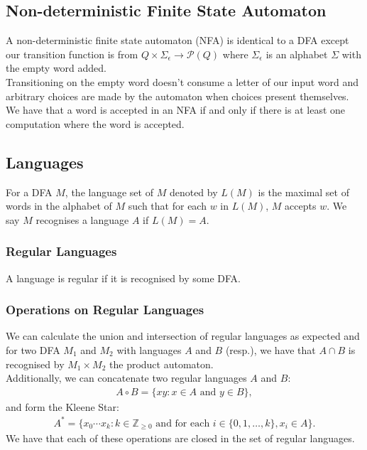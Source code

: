 \subsection{Non-deterministic Finite State Automaton}

A non-deterministic finite state automaton (NFA) is identical
to a DFA except our transition function is from 
$Q \times \Sigma_\epsilon \to \mathcal{P}(Q)$ where
$\Sigma_\epsilon$ is an alphabet $\Sigma$ with the empty word
added.
\\[\baselineskip]
Transitioning on the empty word doesn't consume a letter of our
input word and arbitrary choices are made by the automaton when
choices present themselves. We have that a word is accepted
in an NFA if and only if there is at least one computation where 
the word is accepted.
    
\subsection{Languages}

For a DFA $M$, the language set of $M$ denoted by $L(M)$
is the maximal set of words in the alphabet of $M$ such that
for each $w$ in $L(M)$, $M$ accepts $w$. We say $M$ recognises
a language $A$ if $L(M) = A$.

\subsubsection{Regular Languages}

A language is regular if it is recognised by some DFA.

\subsubsection{Operations on Regular Languages}

We can calculate the union and intersection of regular languages
as expected and for two DFA $M_1$ and $M_2$ with languages
$A$ and $B$ (resp.), we have that $A \cap B$ is
recognised by $M_1 \times M_2$ the product automaton.
\\[\baselineskip]
Additionally, we can concatenate two regular languages $A$ and
$B$: \begin{gather*}
    A \circ B = \{xy : x \in A \text{ and } y \in B\},
\end{gather*} and form the Kleene Star: \begin{gather*}
    A^* = \{x_0 \cdots x_k : k \in \mathbb{Z}_{\geq 0}
        \text{ and for each } i \in \{0, 1, \ldots, k\}, 
        x_i \in A\}.
\end{gather*} We have that each of these operations are closed
in the set of regular languages.

